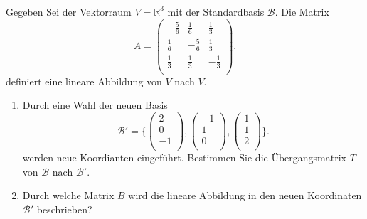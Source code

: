 \subsubsection{} %
Gegeben Sei der Vektorraum $V = \mathbb{R}^3$ mit der Standardbasis $\mathcal{B}$. Die Matrix
\[
A = \begin{pmatrix}
-\frac{5}{6} & \frac{1}{6} & \frac{1}{3} \\
\frac{1}{6}  & -\frac{5}{6} & \frac{1}{3} \\
\frac{1}{3} & \frac{1}{3} & -\frac{1}{3} \\
\end{pmatrix}.
\]
definiert eine lineare Abbildung von $V$ nach $V$.
\begin{enumerate}[label=\alph*)]
    \item Durch eine Wahl der neuen Basis
           \[ \mathcal{B}' = \Biggl\{ 
                                \begin{pmatrix}
                                2\\
                                0\\
                                -1\\
                                \end{pmatrix},
                                \begin{pmatrix}
                                -1\\
                                1\\
                                0\\
                                \end{pmatrix},
                                \begin{pmatrix}
                                1\\
                                1\\
                                2\\
                                \end{pmatrix}
                                \Biggr\}.
                                \]
            werden neue Koordianten eingeführt. Bestimmen Sie die Übergangsmatrix $T$ von $\mathcal{B}$ nach $\mathcal{B}'$.
            \item Durch welche Matrix $B$ wird die lineare Abbildung in den neuen Koordinaten $\mathcal{B}'$ beschrieben?
\end{enumerate}

\newpage

